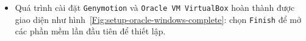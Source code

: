 \documentclass[13pt,a4paper]{extreport}
\begin{document}
\begin{itemize}
\begin{itemize}
					\item Quá trình cài đặt \verb|Genymotion| và \verb|Oracle VM VirtualBox| hoàn thành được giao diện như hình~\ref{Fig:setup-oracle-windows-complete}: chọn \verb|Finish| để mở các phần mềm lần đầu tiên để thiết lập.
						\begin{figure}[!h]
							\vspace{-1cm}
							\begin{center}	
									\hspace{.5cm}
								\\

\end{center}
\end{figure}
\end{itemize}
\end{itemize}
\end{document}
